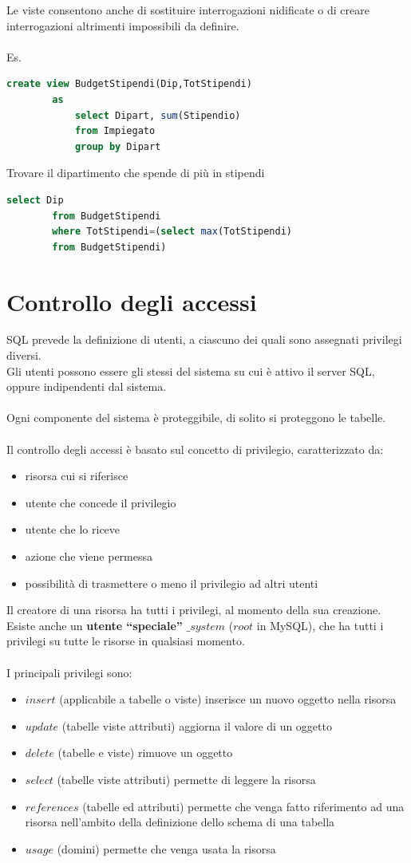 \documentclass{article}
\begin{document}
	Le viste consentono anche di sostituire interrogazioni nidificate o di creare interrogazioni altrimenti impossibili da definire.\\\\
	Es.
	\begin{lstlisting}[language=SQL]
		create view BudgetStipendi(Dip,TotStipendi) 
		as
			select Dipart, sum(Stipendio)
			from Impiegato
			group by Dipart
	\end{lstlisting}
	Trovare il dipartimento che spende di più in stipendi 
	\begin{lstlisting}[language=SQL]
		select Dip
		from BudgetStipendi
		where TotStipendi=(select max(TotStipendi)
		from BudgetStipendi)
	\end{lstlisting}
	\section{Controllo degli accessi}
	SQL prevede la definizione di utenti, a ciascuno dei quali sono assegnati privilegi diversi.\\
	Gli utenti possono essere gli stessi del sistema su cui è attivo il server SQL, oppure indipendenti dal sistema.\\\\
	Ogni componente del sistema è proteggibile, di solito si proteggono le tabelle.\\\\
	Il controllo degli accessi è basato sul concetto di privilegio, caratterizzato da:
	\begin{itemize}
		\item risorsa cui si riferisce
		\item utente che concede il privilegio
		\item utente che lo riceve
		\item azione che viene permessa
		\item possibilità di trasmettere o meno il privilegio ad altri utenti
	\end{itemize}
	Il creatore di una risorsa ha tutti i privilegi, al momento della sua creazione. \\
	Esiste anche un \textbf{utente “speciale”} $\_ system$ ($root$ in MySQL), che ha tutti i privilegi su tutte le risorse in qualsiasi momento.\\\\
	I principali privilegi sono:
	\begin{itemize}
		\item $insert$ (applicabile a tabelle o viste) inserisce un nuovo oggetto nella risorsa
		\item $update$ (tabelle viste attributi) aggiorna il valore di un oggetto
		\item $delete$ (tabelle e viste) rimuove un oggetto
		\item $select$ (tabelle viste attributi) permette di leggere la risorsa
		\item $references$ (tabelle ed attributi) permette che venga fatto riferimento ad una risorsa nell'ambito della definizione dello schema di una tabella
		\item $usage$ (domini) permette che venga usata la risorsa
	\end{itemize}
\end{document}
